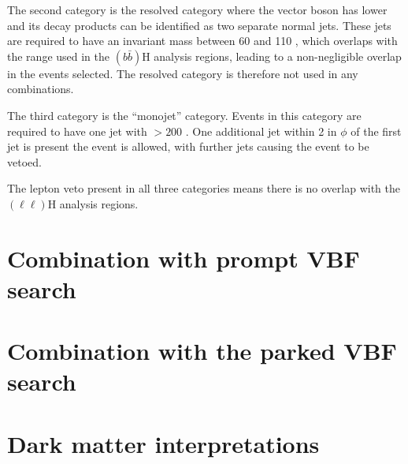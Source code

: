 The second category is the resolved category where the vector boson has lower \pt and its decay products can be identified as two separate normal jets. These jets are required to have an invariant mass between 60 and 110 \GeV, which overlaps with the range used in the \PZ$(b\bar{b})$H analysis regions, leading to a non-negligible overlap in the events selected. The resolved category is therefore not used in any combinations.

The third category is the ``monojet'' category. Events in this category are required to have one jet with \pt$>200$ \GeV. One additional jet within 2 in $\phi$ of the first jet is present the event is allowed, with further jets causing the event to be vetoed.

The lepton veto present in all three categories means there is no overlap with the \PZ$(\ell\ell)$H analysis regions. %



\section{Combination with prompt VBF search}
\label{sec:combprompt}

\section{Combination with the parked VBF search}
\label{sec:combparked}

\section{Dark matter interpretations}
\label{sec:dminterp}
